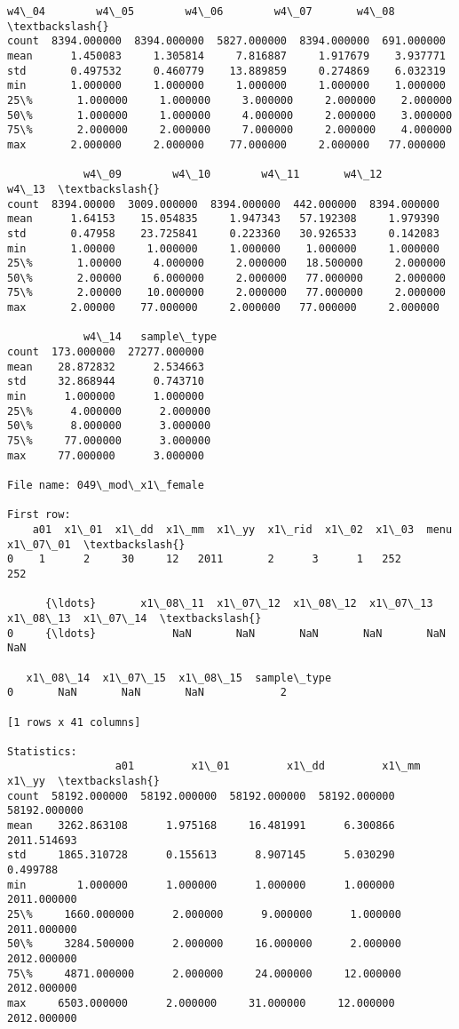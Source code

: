 \documentclass[11pt]{article}
\begin{document}
\begin{Verbatim}[commandchars=\\\{\}]
             w4\_04        w4\_05        w4\_06        w4\_07       w4\_08  \textbackslash{}
count  8394.000000  8394.000000  5827.000000  8394.000000  691.000000   
mean      1.450083     1.305814     7.816887     1.917679    3.937771   
std       0.497532     0.460779    13.889859     0.274869    6.032319   
min       1.000000     1.000000     1.000000     1.000000    1.000000   
25\%       1.000000     1.000000     3.000000     2.000000    2.000000   
50\%       1.000000     1.000000     4.000000     2.000000    3.000000   
75\%       2.000000     2.000000     7.000000     2.000000    4.000000   
max       2.000000     2.000000    77.000000     2.000000   77.000000   

            w4\_09        w4\_10        w4\_11       w4\_12        w4\_13  \textbackslash{}
count  8394.00000  3009.000000  8394.000000  442.000000  8394.000000   
mean      1.64153    15.054835     1.947343   57.192308     1.979390   
std       0.47958    23.725841     0.223360   30.926533     0.142083   
min       1.00000     1.000000     1.000000    1.000000     1.000000   
25\%       1.00000     4.000000     2.000000   18.500000     2.000000   
50\%       2.00000     6.000000     2.000000   77.000000     2.000000   
75\%       2.00000    10.000000     2.000000   77.000000     2.000000   
max       2.00000    77.000000     2.000000   77.000000     2.000000   

            w4\_14   sample\_type  
count  173.000000  27277.000000  
mean    28.872832      2.534663  
std     32.868944      0.743710  
min      1.000000      1.000000  
25\%      4.000000      2.000000  
50\%      8.000000      3.000000  
75\%     77.000000      3.000000  
max     77.000000      3.000000  

File name: 049\_mod\_x1\_female

First row: 
    a01  x1\_01  x1\_dd  x1\_mm  x1\_yy  x1\_rid  x1\_02  x1\_03  menu  x1\_07\_01  \textbackslash{}
0    1      2     30     12   2011       2      3      1   252       252   

      {\ldots}       x1\_08\_11  x1\_07\_12  x1\_08\_12  x1\_07\_13  x1\_08\_13  x1\_07\_14  \textbackslash{}
0     {\ldots}            NaN       NaN       NaN       NaN       NaN       NaN   

   x1\_08\_14  x1\_07\_15  x1\_08\_15  sample\_type  
0       NaN       NaN       NaN            2  

[1 rows x 41 columns]

Statistics: 
                 a01         x1\_01         x1\_dd         x1\_mm         x1\_yy  \textbackslash{}
count  58192.000000  58192.000000  58192.000000  58192.000000  58192.000000   
mean    3262.863108      1.975168     16.481991      6.300866   2011.514693   
std     1865.310728      0.155613      8.907145      5.030290      0.499788   
min        1.000000      1.000000      1.000000      1.000000   2011.000000   
25\%     1660.000000      2.000000      9.000000      1.000000   2011.000000   
50\%     3284.500000      2.000000     16.000000      2.000000   2012.000000   
75\%     4871.000000      2.000000     24.000000     12.000000   2012.000000   
max     6503.000000      2.000000     31.000000     12.000000   2012.000000   


\end{Verbatim}
\end{document}
